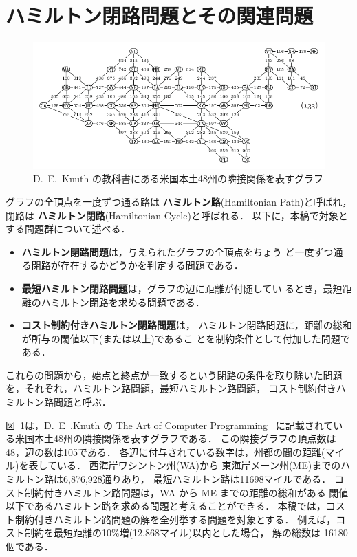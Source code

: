 ﻿%
\section{ハミルトン閉路問題とその関連問題}\label{chap:background}

\begin{figure}[tb]
  \centering
  \includegraphics[width=0.8\linewidth]{fig/taocp_vol4fasc1b_p52_eq133.pdf}
  \caption{D.~E.~Knuth の教科書にある米国本土48州の隣接関係を表すグラフ}
  \label{fig:USmap}
\end{figure}

グラフの全頂点を一度ずつ通る路は
\textbf{ハミルトン路}(Hamiltonian Path)と呼ばれ，
閉路は
\textbf{ハミルトン閉路}(Hamiltonian Cycle)と呼ばれる．
以下に，本稿で対象とする問題群について述べる．
\begin{itemize}
\item \textbf{ハミルトン閉路問題}は，与えられたグラフの全頂点をちょう
  ど一度ずつ通る閉路が存在するかどうかを判定する問題である．
\item \textbf{最短ハミルトン閉路問題}は，グラフの辺に距離が付随してい
  るとき，最短距離のハミルトン閉路を求める問題である．
\item \textbf{コスト制約付きハミルトン閉路問題}は，
  ハミルトン閉路問題に，距離の総和が所与の閾値以下(または以上)であるこ
  とを制約条件として付加した問題である\cite{comp20:Minato}．
\end{itemize}
これらの問題から，始点と終点が一致するという閉路の条件を取り除いた問題
を，それぞれ，ハミルトン路問題，最短ハミルトン路問題，
コスト制約付きハミルトン路問題と呼ぶ．

図~\ref{fig:USmap}は，D.~E~.Knuth の
The Art of Computer Programming~\cite{Knuth:TAOCP:BDD}
に記載されている米国本土48州の隣接関係を表すグラフである．
この隣接グラフの頂点数は48，辺の数は105である．
各辺に付与されている数字は，州都の間の距離(マイル)を表している．
西海岸ワシントン州(WA)から
東海岸メーン州(ME)までのハミルトン路は6,876,928通りあり，
最短ハミルトン路は11698マイルである．
コスト制約付きハミルトン路問題は，WA から ME までの距離の総和がある
閾値以下であるハミルトン路を求める問題と考えることができる．
本稿では，コスト制約付きハミルトン路問題の解を全列挙する問題を対象とする．
例えば，コスト制約を最短距離の10\%増(12,868マイル)以内とした場合，
解の総数は 16180 個である．

